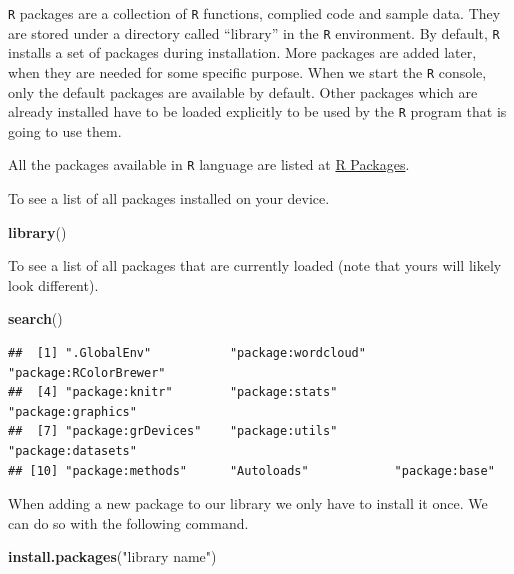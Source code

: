 \documentclass[
]{book}
\newenvironment{Shaded}{\begin{snugshade}}{\end{snugshade}}
\newcommand{\KeywordTok}[1]{\textcolor[rgb]{0.13,0.29,0.53}{\textbf{#1}}}
\newcommand{\NormalTok}[1]{#1}
\newcommand{\StringTok}[1]{\textcolor[rgb]{0.31,0.60,0.02}{#1}}
\begin{document}
\texttt{R} packages are a collection of \texttt{R} functions, complied code and sample data. They are stored under a directory called ``library'' in the \texttt{R} environment. By default, \texttt{R} installs a set of packages during installation. More packages are added later, when they are needed for some specific purpose. When we start the \texttt{R} console, only the default packages are available by default. Other packages which are already installed have to be loaded explicitly to be used by the \texttt{R} program that is going to use them.

All the packages available in \texttt{R} language are listed at \href{https://cran.r-project.org/web/packages/available_packages_by_name.html}{R Packages}.

To see a list of all packages installed on your device.

\begin{Shaded}
\begin{Highlighting}[]
\KeywordTok{library}\NormalTok{()}
\end{Highlighting}
\end{Shaded}

To see a list of all packages that are currently loaded (note that yours will likely look different).

\begin{Shaded}
\begin{Highlighting}[]
\KeywordTok{search}\NormalTok{()}
\end{Highlighting}
\end{Shaded}

\begin{verbatim}
##  [1] ".GlobalEnv"           "package:wordcloud"    "package:RColorBrewer"
##  [4] "package:knitr"        "package:stats"        "package:graphics"    
##  [7] "package:grDevices"    "package:utils"        "package:datasets"    
## [10] "package:methods"      "Autoloads"            "package:base"
\end{verbatim}

When adding a new package to our library we only have to install it once. We can do so with the following command.

\begin{Shaded}
\begin{Highlighting}[]
\KeywordTok{install.packages}\NormalTok{(}\StringTok{"library name"}\NormalTok{)}
\end{Highlighting}
\end{Shaded}
\end{document}
